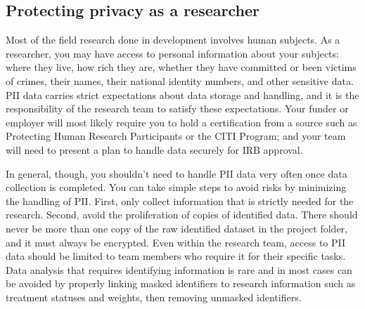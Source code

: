 \subsection{Protecting privacy as a researcher}

Most of the field research done in development involves human subjects.
As a researcher, you may have access to personal information about your subjects:
where they live, how rich they are, whether they have committed or been victims of crimes,
their names, their national identity numbers, and other sensitive data.
PII data carries strict expectations about data storage and handling,
and it is the responsibility of the research team to satisfy these expectations.
Your funder or employer will most likely require you to hold a certification from a source
such as Protecting Human Research Participants
or the CITI Program;
and your team will need to present a plan to handle data securely for IRB approval.

In general, though, you shouldn't need to handle PII data very often
once data collection is completed.
You can take simple steps to avoid risks by minimizing the handling of PII.
First, only collect information that is strictly needed for the research.
Second, avoid the proliferation of copies of identified data.
There should never be more than one copy of the raw identified dataset in the project folder,
and it must always be encrypted.
Even within the research team,
access to PII data should be limited to team members who require it for their specific tasks.
Data analysis that requires identifying information is rare
and in most cases can be avoided by properly linking masked identifiers to research information
such as treatment statuses and weights, then removing unmasked identifiers.


